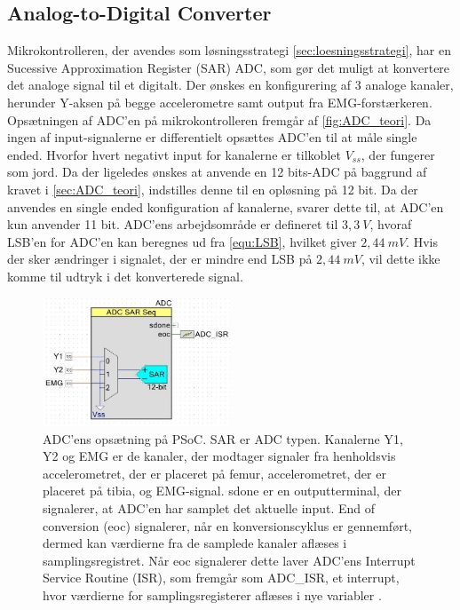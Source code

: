 \subsection{Analog-to-Digital Converter} \label{sec:ADC_imp}
Mikrokontrolleren, der avendes som løsningsstrategi \autoref{sec:loesningsstrategi}, har en Sucessive Approximation Register (SAR) ADC, som gør det muligt at konvertere det analoge signal til et digitalt. Der ønskes en konfigurering af 3 analoge kanaler, herunder Y-aksen på begge accelerometre samt output fra EMG-forstærkeren. Opsætningen af ADC'en på mikrokontrolleren fremgår af \autoref{fig:ADC_teori}. Da ingen af input-signalerne er differentielt opsættes ADC'en til at måle single ended. Hvorfor hvert negativt input for kanalerne er tilkoblet $V_{ss}$, der fungerer som jord. Da der ligeledes ønskes at anvende en 12 bits-ADC på baggrund af kravet i \autoref{sec:ADC_teori}, indstilles denne til en opløsning på 12 bit. Da der anvendes en single ended konfiguration af kanalerne, svarer dette til, at ADC'en kun anvender 11 bit. ADC'ens arbejdsområde er defineret til $3,3~V$, hvoraf  LSB'en for ADC'en kan beregnes ud fra \autoref{equ:LSB}, hvilket giver $2,44~mV$. Hvis der sker ændringer i signalet, der er mindre end LSB på $2,44~mV$, vil dette ikke komme til udtryk i det konverterede signal. 


\begin{figure}[H]
\centering
\includegraphics[width=0.5\textwidth]{figures/implementering/ADC_imp.jpg}
\caption{ADC'ens opsætning på PSoC. SAR er ADC typen. Kanalerne Y1, Y2 og EMG er de kanaler, der modtager signaler fra henholdsvis accelerometret, der er placeret på femur, accelerometret, der er placeret på tibia, og EMG-signal. sdone er en outputterminal, der signalerer, at ADC'en har samplet det aktuelle input. End of conversion (eoc) signalerer, når en konversionscyklus er gennemført, dermed kan værdierne fra de samplede kanaler aflæses i samplingsregistret. Når eoc signalerer dette laver ADC'ens Interrupt Service Routine (ISR), som fremgår som ADC\_ISR, et interrupt, hvor værdierne for samplingsregisterer aflæses i nye variabler \citep{ADC2014}.}
\label{fig:ADC_teori}
\end{figure}


